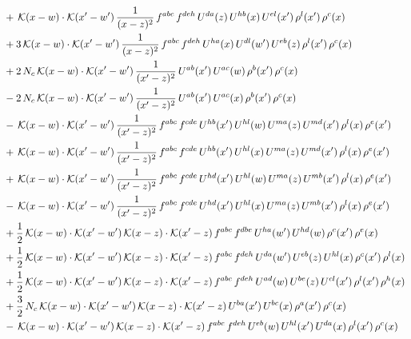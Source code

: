 \documentclass[9pt]{article}
\numberwithin{equation}{section}
\begin{document}
\begin{align}
&+\,\mathcal{K}(x-w)\cdot\mathcal{K}(x'-w')\,\frac{1}{(x-z)^{2}}\,f^{abc}\,f^{deh}\,U^{da}(z)\,U^{hb}(x)\,U^{el}(x')\,\rho^{l}(x')\,\rho^{c}(x)\notag\\
&+3\,\mathcal{K}(x-w)\cdot\mathcal{K}(x'-w')\,\frac{1}{(x-z)^{2}}\,f^{abc}\,f^{deh}\,U^{ha}(x)\,U^{dl}(w')\,U^{eb}(z)\,\rho^{l}(x')\,\rho^{c}(x)\notag\\
&+2\,N_{c}\,\mathcal{K}(x-w)\cdot\mathcal{K}(x'-w')\,\frac{1}{(x'-z)^{2}}\,U^{ab}(x')\,U^{ac}(w)\,\rho^{b}(x')\,\rho^{c}(x)\notag\\
&-2\,N_{c}\,\mathcal{K}(x-w)\cdot\mathcal{K}(x'-w')\,\frac{1}{(x'-z)^{2}}\,U^{ab}(x')\,U^{ac}(x)\,\rho^{b}(x')\,\rho^{c}(x)\notag\\
&-\,\mathcal{K}(x-w)\cdot\mathcal{K}(x'-w')\,\frac{1}{(x'-z)^{2}}\,f^{abc}\,f^{cde}\,U^{hb}(x')\,U^{hl}(w)\,U^{ma}(z)\,U^{md}(x')\,\rho^{l}(x)\,\rho^{e}(x')\notag\\
&+\,\mathcal{K}(x-w)\cdot\mathcal{K}(x'-w')\,\frac{1}{(x'-z)^{2}}\,f^{abc}\,f^{cde}\,U^{hb}(x')\,U^{hl}(x)\,U^{ma}(z)\,U^{md}(x')\,\rho^{l}(x)\,\rho^{e}(x')\notag\\
&+\,\mathcal{K}(x-w)\cdot\mathcal{K}(x'-w')\,\frac{1}{(x'-z)^{2}}\,f^{abc}\,f^{cde}\,U^{hd}(x')\,U^{hl}(w)\,U^{ma}(z)\,U^{mb}(x')\,\rho^{l}(x)\,\rho^{e}(x')\notag\\
&-\,\mathcal{K}(x-w)\cdot\mathcal{K}(x'-w')\,\frac{1}{(x'-z)^{2}}\,f^{abc}\,f^{cde}\,U^{hd}(x')\,U^{hl}(x)\,U^{ma}(z)\,U^{mb}(x')\,\rho^{l}(x)\,\rho^{e}(x')\notag\\
&+\frac{1}{2}\,\mathcal{K}(x-w)\cdot\mathcal{K}(x'-w')\,\mathcal{K}(x-z)\cdot\mathcal{K}(x'-z)\,f^{abc}\,f^{dbe}\,U^{ha}(w')\,U^{hd}(w)\,\rho^{c}(x')\,\rho^{e}(x)\notag\\
&+\frac{1}{2}\,\mathcal{K}(x-w)\cdot\mathcal{K}(x'-w')\,\mathcal{K}(x-z)\cdot\mathcal{K}(x'-z)\,f^{abc}\,f^{deh}\,U^{da}(w')\,U^{eb}(z)\,U^{hl}(x)\,\rho^{c}(x')\,\rho^{l}(x)\notag\\
&+\frac{1}{2}\,\mathcal{K}(x-w)\cdot\mathcal{K}(x'-w')\,\mathcal{K}(x-z)\cdot\mathcal{K}(x'-z)\,f^{abc}\,f^{deh}\,U^{ad}(w)\,U^{be}(z)\,U^{cl}(x')\,\rho^{l}(x')\,\rho^{h}(x)\notag\\
&+\frac{3}{2}\,N_{c}\,\mathcal{K}(x-w)\cdot\mathcal{K}(x'-w')\,\mathcal{K}(x-z)\cdot\mathcal{K}(x'-z)\,U^{ba}(x')\,U^{bc}(x)\,\rho^{a}(x')\,\rho^{c}(x)\notag\\
&-\,\mathcal{K}(x-w)\cdot\mathcal{K}(x'-w')\,\mathcal{K}(x-z)\cdot\mathcal{K}(x'-z)\,f^{abc}\,f^{deh}\,U^{eb}(w)\,U^{hl}(x')\,U^{da}(x)\,\rho^{l}(x')\,\rho^{c}(x)\notag\\

\end{align}
\end{document}
